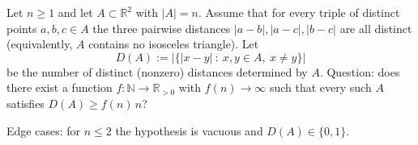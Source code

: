 Let $n\ge 1$ and let $A\subset\mathbb{R}^2$ with $|A|=n$.
Assume that for every triple of distinct points $a,b,c\in A$ the three pairwise distances
$|a-b|,|a-c|,|b-c|$ are all distinct (equivalently, $A$ contains no isosceles triangle).
Let
\[
D(A):=\bigl|\bigl\{|x-y|\ :\ x,y\in A,\ x\neq y\bigr\}\bigr|
\]
be the number of distinct (nonzero) distances determined by $A$.
Question: does there exist a function $f:\mathbb{N}\to\mathbb{R}_{>0}$ with $f(n)\to\infty$
such that every such $A$ satisfies $D(A)\ge f(n)\,n$?

Edge cases: for $n\le 2$ the hypothesis is vacuous and $D(A)\in\{0,1\}$.

